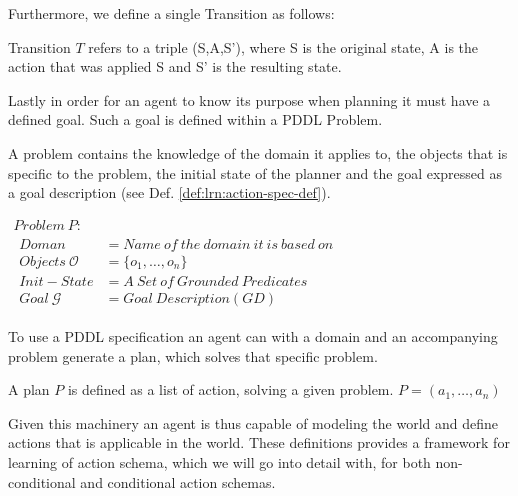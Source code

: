 \documentclass[../Master.tex]{subfiles}
\begin{document}
Furthermore, we define a single Transition as follows:

\begin{definition} 
	Transition $T$ refers to a triple (S,A,S'), where S is the original state, A is the action that was applied S and S' is the resulting state.
\end{definition}

Lastly in order for an agent to know its purpose when planning it must have a defined goal. Such a goal is defined within a PDDL Problem.

\begin{definition} A problem contains the knowledge of the domain it applies to, the objects that is specific to the problem, the initial state of the planner and the goal expressed as a goal description (see Def.  \ref{def:lrn:action-spec-def}).
	
	$
	\begin{array}{ll}
	Problem ~ P: & \\
	
	\begin{array}{ll}
	Doman & = Name ~ of ~ the ~ domain ~ it ~ is ~ based ~ on \\
	Objects ~ \mathcal{O} & = \{o_1,\dots,o_n\}			 \\  
	Init-State& = A ~ Set ~ of ~ Grounded ~ Predicates \\
	Goal ~ \mathcal{G} & = Goal ~ Description(GD)
	\end{array}
	\end{array}$
\end{definition}

To use a PDDL specification an agent can with a domain and an accompanying problem generate a plan, which solves that specific problem.

\begin{definition} 
	A plan $P$ is defined as a list of action, solving a given problem.
	$P = (a_1,\dots,a_n)$
\end{definition}

Given this machinery an agent is thus capable of modeling the world and define actions that is applicable in the world. These definitions provides a framework for learning of action schema, which we will go into detail with, for both non-conditional and conditional action schemas.


	
	
\end{document}
